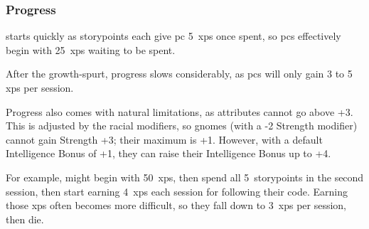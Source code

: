 \begin{multicols}{2}
\subsubsection{Progress}
starts quickly as \glspl{storypoint} each give \gls{pc} 5~\glspl{xp} once spent, so \glspl{pc} effectively begin with 25~\glspl{xp} waiting to be spent.


After the growth-spurt, progress slows considerably, as \glspl{pc} will only gain 3 to 5 \glspl{xp} per session.

\label{racial_limits}

Progress also comes with natural limitations, as \glspl{attribute} cannot go above +3.
This is adjusted by the racial modifiers, so gnomes (with a -2 Strength modifier) cannot gain Strength +3; their maximum is +1.
However, with a default Intelligence Bonus of +1, they can raise their Intelligence Bonus up to +4.

For example,  might begin with 50~\glspl{xp}, then spend all 5~\glspl{storypoint} in the second session, then start earning 4~\glspl{xp} each session for following their code.
Earning those \glspl{xp} often becomes more difficult, so they fall down to 3~\glspl{xp} per session, then die.

\newcommand\describeFullCycle{%
  \showCycle~\arabic{fenestraDay}%
}

\setcounter{xp}{0}
\newcommand\runningXPtotal[1]{%
  \addtocounter{xp}{#1}%
  \setcounter{fp}{\value{xp}}%
  \divide\value{fp} by 10%
  \addtocounter{fp}{0}%
  \arabic{xp}
}

\setcounter{r12}{\month}
\setcounter{track}{\day}
\addtocounter{track}{20}

\newcommand\realMonth[1][7]{%
  \addtocounter{track}{#1}%
  \ifnum\value{track}>30%
    \addtocounter{track}{-30}%
    \stepcounter{r12}%
  \fi%
  \trackMonth[r12]~\arabic{track}%
  \setCycle{\value{r12}}{\value{track}}%
}


\end{multicols}

